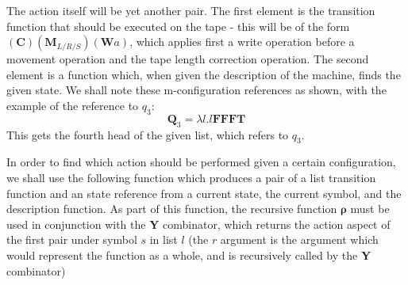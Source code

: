 \documentclass[Master.tex]{subfiles}
\begin{document}
The action itself will be yet another pair. The first element is the transition function that should be executed on the tape - this will be of the form $(\bm{C})(\bm{M}_{L/R/S})(\bm{W}a)$, which applies first a write operation before a movement operation and the tape length correction operation. The second element is a function which, when given the description of the machine, finds the given state. We shall note these m-configuration references as shown, with the example of the reference to $q_3$:
\begin{equation*}
\bm{Q}_3 = \lambda l.l\bm{\textbf{FFFT}}
\end{equation*}
This gets the fourth head of the given list, which refers to $q_3$.



In order to find which action should be performed given a certain configuration, we shall use the following function which produces a pair of a list transition function and an state reference from a current state, the current symbol, and the description function. As part of this function, the recursive function $\bm{\rho}$ must be used in conjunction with the \textbf{Y} combinator, which returns the action aspect of the first pair under symbol $s$ in list $l$ (the $r$ argument is the argument which would represent the function as a whole, and is recursively called by the \textbf{Y} combinator)
\end{document}
